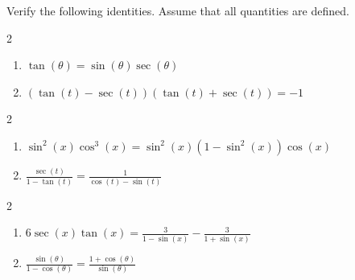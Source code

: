 \documentclass{ximera}
\begin{document}
\begin{example} \label{idornotex1} Verify the following identities. Assume that all quantities are defined.

\begin{multicols}{2}

\begin{enumerate}

\item  $\tan(\theta) = \sin(\theta) \sec(\theta)$

\item  $(\tan(t) - \sec(t)) (\tan(t) + \sec(t))  = -1$

\setcounter{HW}{\value{enumi}}

\end{enumerate}

\end{multicols}

\begin{multicols}{2}

\begin{enumerate}

\setcounter{enumi}{\value{HW}}

\item  $\sin^{2}(x) \cos^{3}(x) = \sin^{2}(x) \left(1 - \sin^{2}(x)\right) \cos(x)$ 

\item  $\frac{\sec(t)}{1 - \tan(t)} = \frac{1}{\cos(t) - \sin(t)}$

\setcounter{HW}{\value{enumi}}

\end{enumerate}

\end{multicols}

\begin{multicols}{2}

\begin{enumerate}

\setcounter{enumi}{\value{HW}}

\item  $6\sec(x) \tan(x) = \frac{3}{1-\sin(x)} - \frac{3}{1 + \sin(x)}$

\item  \label{pythconjex} $\frac{\sin(\theta)}{1 - \cos(\theta)} = \frac{1 + \cos(\theta)}{\sin(\theta)}$

\end{enumerate}

\end{multicols}


\end{example}
\end{document}
